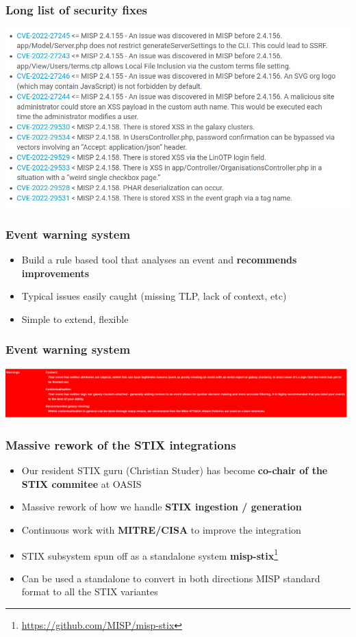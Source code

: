 \begin{frame}
\frametitle{Long list of security fixes}
\includegraphics[scale=0.4]{images/security.png}
\end{frame}


\begin{frame}
  \frametitle{Event warning system}
  \begin{itemize}
     \item Build a rule based tool that analyses an event and {\bf recommends improvements}
     \item Typical issues easily caught (missing TLP, lack of context, etc)
     \item Simple to extend, flexible
  \end{itemize}
\end{frame}

\begin{frame}
\frametitle{Event warning system}
\includegraphics[scale=0.3]{images/warnings.png}
\end{frame}


\begin{frame}
  \frametitle{Massive rework of the STIX integrations}
  \begin{itemize}
     \item Our resident STIX guru (Christian Studer) has become {\bf co-chair of the STIX commitee} at OASIS
     \item Massive rework of how we handle {\bf STIX ingestion / generation}
     \item Continuous work with {\bf MITRE/CISA} to improve the integration
     \item STIX subsystem spun off as a standalone system {\bf misp-stix}\footnote{\url{https://github.com/MISP/misp-stix}}
     \item Can be used a standalone to convert in both directions MISP standard format to all the STIX variantes
  \end{itemize}
\end{frame}

